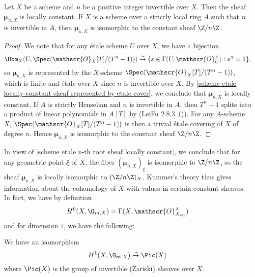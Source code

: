 \begin{proposition}\label{scheme etale n-th root sheaf locally constant}
Let $X$ be a scheme and $n$ be a positive integer invertible over $X$. Then the sheaf $\bm{\mu}_{n,X}$ is locally constant. If $X$ is a scheme over a strictly local ring $A$ such that $n$ is invertible in $A$, then $\bm{\mu}_{n,X}$ is isomorphic to the constant sheaf $\Z/n\Z$.
\end{proposition}
\begin{proof}
We note that for any \'etale scheme $U$ over $X$, we have a bijection
\[\Hom_X(U,\Spec(\mathscr{O}_X[T]/(T^n-1))) \stackrel{\sim}{\to} \{s\in\Gamma(U,\mathscr{O}_U^\times):s^n=1\},\]
so $\bm{\mu}_{n,X}$ is represented by the $X$-scheme $\Spec(\mathscr{O}_X[T]/(T^n-1))$, which is finite and \'etale over $X$ since $n$ is invertible over $X$. By \cref{scheme etale locally constant sheaf represented by etale cover}, we conclude that $\bm{\mu}_{n,X}$ is locally constant. If $A$ is strictly Henselian and $n$ is invertible in $A$, then $T^n-1$ splits into a product of linear polynomials in $A[T]$ by (LeiFu 2.8.3~()). For any $A$-scheme $X$, $\Spec(\mathscr{O}_X[T]/(T^n-1))$ is then a trivial \'etale covering of $X$ of degree $n$. Hence $\bm{\mu}_{n,X}$ is isomorphic to the constant sheaf $\Z/n\Z$.
\end{proof}
In view of \cref{scheme etale n-th root sheaf locally constant}, we conclude that for any geometric point $\xi$ of $X$, the fiber $(\bm{\mu}_{n,X})_\xi$ is isomorphic to $\Z/n\Z$, so the sheaf $\bm{\mu}_{n,X}$ is locally isomorphic to $(\Z/n\Z)_X$. Kummer's theory thus gives information about the cohomology of $X$ with values in certain constant sheaves. In fact, we have by definition
\[H^0(X,\G_{m,X})=\Gamma(X,\mathscr{O}_{X_\et}^\times)\]
and for dimension $1$, we have the following:
\begin{theorem}\label{scheme etale Hilbert theorem 90}
We have an isomorphism
\[H^1(X,\G_{m,X}) \stackrel{\sim}{\to} \Pic(X)\]
where $\Pic(X)$ is the group of invertible (Zariski) sheaves over $X$.
\end{theorem}
